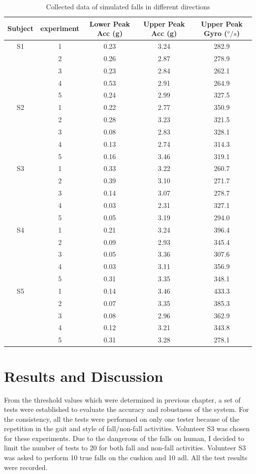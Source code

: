 \documentclass[letterpaper,12pt,titlepage,oneside,final]{book}
\let\origdoublepage\cleardoublepage
\newcommand{\clearemptydoublepage}{%
	\clearpage{\pagestyle{empty}\origdoublepage}}
\let\cleardoublepage\clearemptydoublepage
\begin{document}
\begin{table}[h]
	\begin{center}
		\begin{tabular}{ |c|c|c|c|c| } 
			\hline
			Subject & experiment & Lower Peak Acc (g) & Upper Peak Acc (g)  & Upper Peak Gyro ($^{o}/s$)\\
			\hline
			S1 & 1 & 0.23 & 3.24 & 282.9\\%
			& 2 & 0.26 & 2.87 & 278.9 \\
			& 3 & 0.23 & 2.84 & 262.1 \\
			& 4 & 0.53 &  2.91 & 264.9 \\
			& 5 & 0.24 &  2.99 & 327.5\\
			\hline
			S2 & 1 & 0.22 & 2.77 & 350.9\\
			& 2 &  0.28 &  3.23 & 321.5\\
			& 3 &  0.08 &  2.83& 328.1\\
			& 4 & 0.13 & 2.74 & 314.3\\
			& 5 & 0.16 & 3.46 & 319.1\\  %
			\hline
			S3 & 1 & 0.33 &  3.22& 260.7 \\
			& 2 &  0.39 & 3.10 & 271.7 \\
			& 3 & 0.14 & 3.07 & 278.7\\
			& 4 & 0.03 & 2.31 & 327.1\\
			& 5 & 0.05 & 3.19 & 294.0\\ %
			\hline
			S4 &1 & 0.21 & 3.24 & 396.4\\ 
			&2 &  0.09 & 2.93 & 345.4\\ 
			&3 & 0.05 & 3.36 & 307.6\\ 
			&4 & 0.03 & 3.11 & 356.9\\ 
			&5 & 0.31 & 3.35 & 348.1\\ %
			\hline
			S5 &1 & 0.14 & 3.46 & 433.3\\ 
			&2 &  0.07 & 3.35 & 385.3\\ 
			&3 & 0.08 & 2.96 & 362.9\\ 
			&4 & 0.12 & 3.21 & 343.8\\ 
			&5 & 0.31 & 3.28 & 278.1\\ %
			\hline
		\end{tabular}
		\caption{Collected data of simulated falls in different directions}
		\label{table:1}
	\end{center}
\end{table}
\cleardoublepage

\chapter{Results and Discussion}
From the threshold values which were determined in previous chapter, a set of tests were established to evaluate the accuracy and robustness of the system. For the consistency, all the tests were performed on only one tester because of the repetition in the gait and style of fall/non-fall activities. Volunteer S3 was chosen for these experiments. Due to the dangerous of the falls on human, I decided to limit the number of tests to 20 for both fall and non-fall activities. Volunteer S3 was asked to perform 10 true falls on the cushion and 10 \gls{adl}. All the test results were recorded.      
\end{document}

